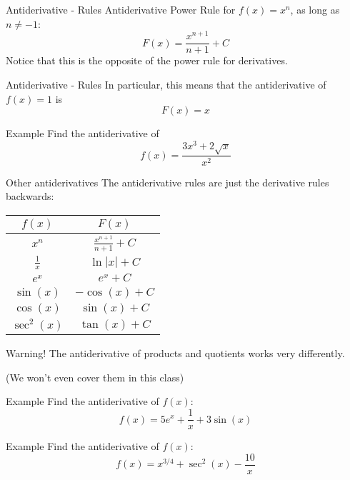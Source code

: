 \documentclass[t]{beamer}
\begin{document}
\begin{frame}{Antiderivative - Rules}
Antiderivative Power Rule for $f(x) = x^n$, as long as 
$n \neq -1$:
$$ F(x) = \frac{x^{n+1}}{n+1} + C$$
Notice that this is the opposite of the power rule for
derivatives.
\end{frame}

\begin{frame}{Antiderivative - Rules}
In particular, this means that the antiderivative of $f(x) = 1$ is
$$F(x) = x$$
\end{frame}

\begin{frame}{Example}
Find the antiderivative of 
$$f(x) = \frac{3x^3 + 2\sqrt{x}}{x^2}$$
\end{frame}

\begin{frame}{Other antiderivatives}
The antiderivative rules are just the derivative rules backwards:
\begin{center}
\begin{tabular}{|c|c|}
\hline
$f(x)$ & $F(x)$ \\
\hline
$x^n$ & $\frac{x^{n+1}}{n+1}  + C$ \\
$\frac{1}{x}$ & $\ln{|x|}  + C$ \\
$e^x $ & $e^x + C$ \\
$\sin(x)$ & $-\cos(x) + C$ \\
$\cos(x)$ & $\sin(x) + C$ \\
$\sec^2(x)$ & $\tan(x) + C$ \\
\hline
\end{tabular}
\end{center}
\end{frame}

\begin{frame}{Warning!}
The antiderivative of products and quotients works
very differently.

\vspace{3in}

(We won't even cover them in this class)
\end{frame}

\begin{frame}{Example}
Find the antiderivative of $f(x)$:
$$f(x) = 5e^x + \frac{1}{x} + 3 \sin(x)$$
\end{frame}

\begin{frame}{Example}
Find the antiderivative of $f(x)$:
$$f(x) = x^{3/4} + \sec^2(x) - \frac{10}{x}$$
\end{frame}
\end{document}
